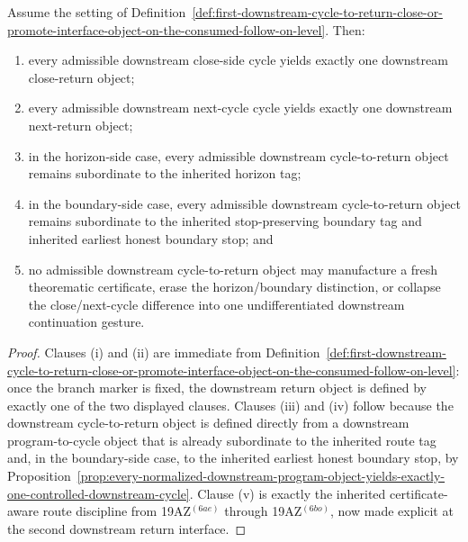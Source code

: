 \begin{proposition}
\label{prop:every-consumed-downstream-cycle-yields-exactly-one-honest-downstream-return-close-or-promote-object}
Assume the setting of Definition~\ref{def:first-downstream-cycle-to-return-close-or-promote-interface-object-on-the-consumed-follow-on-level}. Then:
\begin{enumerate}[label=(\roman*)]
  \item every admissible downstream close-side cycle yields exactly one downstream close-return object;
  \item every admissible downstream next-cycle cycle yields exactly one downstream next-return object;
  \item in the horizon-side case, every admissible downstream cycle-to-return object remains subordinate to the inherited horizon tag;
  \item in the boundary-side case, every admissible downstream cycle-to-return object remains subordinate to the inherited stop-preserving boundary tag and inherited earliest honest boundary stop; and
  \item no admissible downstream cycle-to-return object may manufacture a fresh theorematic certificate, erase the horizon/boundary distinction, or collapse the close/next-cycle difference into one undifferentiated downstream continuation gesture.
\end{enumerate}
\end{proposition}

\begin{proof}
Clauses (i) and (ii) are immediate from Definition~\ref{def:first-downstream-cycle-to-return-close-or-promote-interface-object-on-the-consumed-follow-on-level}: once the branch marker is fixed, the downstream return object is defined by exactly one of the two displayed clauses. Clauses (iii) and (iv) follow because the downstream cycle-to-return object is defined directly from a downstream program-to-cycle object that is already subordinate to the inherited route tag and, in the boundary-side case, to the inherited earliest honest boundary stop, by Proposition~\ref{prop:every-normalized-downstream-program-object-yields-exactly-one-controlled-downstream-cycle}. Clause (v) is exactly the inherited certificate-aware route discipline from 19AZ$^{(6ae)}$ through 19AZ$^{(6bo)}$, now made explicit at the second downstream return interface.
\end{proof}

